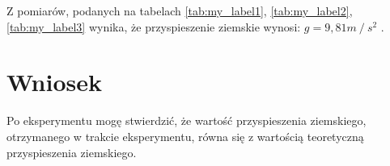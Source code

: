 \documentclass[a4paper,12pt]{article}
\begin{document}
Z pomiarów, podanych na tabelach \ref{tab:my_label1}, \ref{tab:my_label2}, \ref{tab:my_label3} wynika, że przyspieszenie ziemskie wynosi: $g=9,81  m⁄s^2$ .

\section{Wniosek}

Po eksperymentu mogę stwierdzić, że wartość przyspieszenia ziemskiego, otrzymanego w trakcie eksperymentu, równa się z wartością teoretyczną przyspieszenia ziemskiego.
\end{document}
